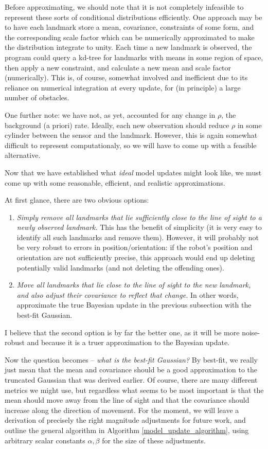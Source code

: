 \documentclass[12pt]{article}
\begin{document}
Before approximating, we should note that it is not completely infeasible to represent these sorts of conditional distributions efficiently. One approach may be to have each landmark store a mean, covariance, constraints of some form, and the corresponding scale factor which can be numerically approximated to make the distribution integrate to unity. Each time a new landmark is observed, the program could query a kd-tree for landmarks with means in some region of space, then apply a new constraint, and calculate a new mean and scale factor (numerically). This is, of course, somewhat involved and inefficient due to its reliance on numerical integration at every update, for (in principle) a large number of obstacles.

One further note: we have not, as yet, accounted for any change in $\rho$, the background (a priori) rate. Ideally, each new observation should reduce $\rho$ in some cylinder between the sensor and the landmark. However, this is again somewhat difficult to represent computationaly, so we will have to come up with a feasible alternative.

Now that we have established what \textit{ideal} model updates might look like, we must come up with some reasonable, efficient, and realistic approximations.

At first glance, there are two obvious options:
\begin{enumerate}
\item \textit{Simply remove all landmarks that lie sufficiently close to the line of sight to a newly observed landmark.} This has the benefit of simplicity (it is very easy to identify all such landmarks and remove them). However, it will probably not be very robust to errors in position/orientation: if the robot's position and orientation are not sufficiently precise, this approach would end up deleting potentially valid landmarks (and not deleting the offending ones).
\item \textit{Move all landmarks that lie close to the line of sight to the new landmark, and also adjust their covariance to reflect that change.} In other words, approximate the true Bayesian update in the previous subsection with the best-fit Gaussian.
\end{enumerate}

I believe that the second option is by far the better one, as it will be more noise-robust and because it is a truer approximation to the Bayesian update.

Now the question becomes -- \textit{what is the best-fit Gaussian?} By best-fit, we really just mean that the mean and covariance should be a good approximation to the truncated Gaussian that was derived earlier. Of course, there are many different metrics we might use, but regardless what seems to be most important is that the mean should move away from the line of sight and that the covariance should increase along the direction of movement. For the moment, we will leave a derivation of precisely the right magnitude adjustments for future work, and outline the general algorithm in Algorithm \ref{model_update_algorithm}, using arbitrary scalar constants $\alpha, \beta$ for the size of these adjustments.
\end{document}
